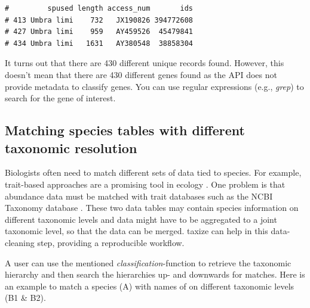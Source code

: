\begin{sloppypar}
\begin{knitrout}\small
{}\color{fgcolor}\begin{kframe}
\begin{alltt}
\hlstd{out[}\hlstd{(}\hlopt{$}  \hlstd{=} \hlstd{),} \hlopt{-}\hlstd{]}
\end{alltt}
\begin{verbatim}
#         spused length access_num       ids
# 413 Umbra limi    732   JX190826 394772608
# 427 Umbra limi    959   AY459526  45479841
# 434 Umbra limi   1631   AY380548  38858304
\end{verbatim}
\end{kframe}
\end{knitrout}


It turns out that there are 430 different unique records found. 
However, this doesn't mean that there are 430 different genes found as the API does not provide metadata to classify genes. 
You can use regular expressions (e.g., \emph{grep}) to search for the gene of interest.


\subsection{Matching species tables with different taxonomic resolution}
Biologists often need to match different sets of data tied to species. 
For example, trait-based approaches are a promising tool in ecology \citep{statzner_can_2010}. 
One problem is that abundance data must be matched with trait databases such as the NCBI Taxonomy database \citep{usseglio-polatera_biological_2000}. 
These two data tables may contain species information on different taxonomic levels and data might have to be aggregated to a joint taxonomic level, so that the data can be merged. 
taxize can help in this data-cleaning step, providing a reproducible workflow.

A user can use the mentioned \emph{classification}-function to retrieve the taxonomic hierarchy and then search the hierarchies up- and downwards for matches. 
Here is an example to match a species (A) with names of on different taxonomic levels (B1 \& B2).


\end{sloppypar}
